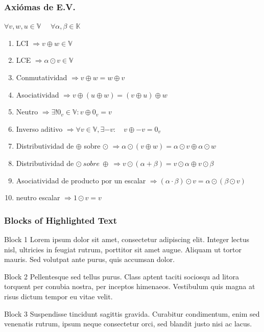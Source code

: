 \documentclass{beamer}
\begin{document}

\begin{frame}
\frametitle{Axiómas de E.V.}
$\forall v,w,u \in \mathbb{V} \quad  $  $\forall \alpha, \beta \in \mathbb{K} $ \\
\begin{enumerate}
\item LCI $ \Rightarrow v \oplus  w \in \mathbb{V} $
\item LCE $\Rightarrow \alpha \odot  v \in \mathbb{V}$
\item Conmutatividad $\Rightarrow v \oplus w = w \oplus v$
\item Asociatividad $\Rightarrow v \oplus (u\oplus w) = (v \oplus u)  \oplus w$
\item Neutro $\Rightarrow \exists! 0_v \in \mathbb{V} : v \oplus 0_v = v $
\item Inverso aditivo $ \Rightarrow  \forall v \in \mathbb{V}, \exists - v: \quad v \oplus - v = 0_v$
\item Distributividad de $ \oplus $ sobre $ \odot $ $ \Rightarrow \alpha \odot (v \oplus w) = \alpha \odot v \oplus \alpha \odot w $  
\item Distributividad de $ \odot \ sobre \ \oplus \ \Rightarrow v \odot ( \alpha + \beta ) = v \odot \alpha  \oplus v \odot \beta $
\item Asociatividad de producto por un escalar $ \Rightarrow (\alpha \cdot \beta ) \odot v = \alpha \odot (\beta \odot v)$
\item neutro escalar $ \Rightarrow 1 \odot v = v$
\end{enumerate}
\end{frame}


\begin{frame}
\frametitle{Blocks of Highlighted Text}
\begin{block}{Block 1}
Lorem ipsum dolor sit amet, consectetur adipiscing elit. Integer lectus nisl, ultricies in feugiat rutrum, porttitor sit amet augue. Aliquam ut tortor mauris. Sed volutpat ante purus, quis accumsan dolor.
\end{block}

\begin{block}{Block 2}
Pellentesque sed tellus purus. Class aptent taciti sociosqu ad litora torquent per conubia nostra, per inceptos himenaeos. Vestibulum quis magna at risus dictum tempor eu vitae velit.
\end{block}

\begin{block}{Block 3}
Suspendisse tincidunt sagittis gravida. Curabitur condimentum, enim sed venenatis rutrum, ipsum neque consectetur orci, sed blandit justo nisi ac lacus.
\end{block}
\end{frame}
\end{document}

